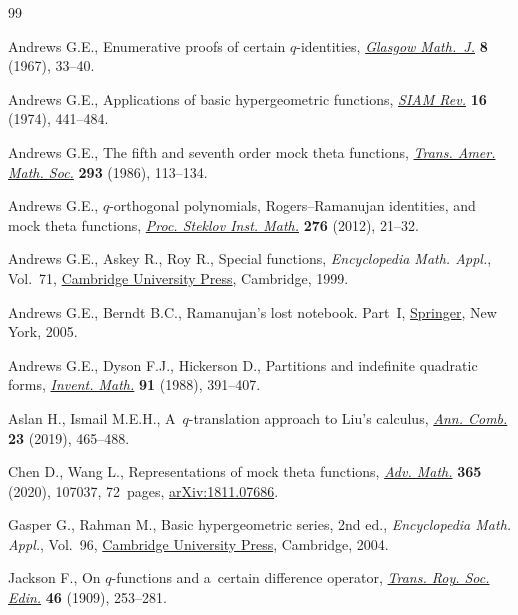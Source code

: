 \begin{thebibliography}{99}
\footnotesize\itemsep=0pt

Andrews G.E., Enumerative proofs of certain {$q$}-identities, \href{https://doi.org/10.1017/S0017089500000057}{\textit{Glasgow
 Math.~J.}} \textbf{8} (1967), 33--40.

Andrews G.E., Applications of basic hypergeometric functions, \href{https://doi.org/10.1137/1016081}{\textit{SIAM
 Rev.}} \textbf{16} (1974), 441--484.

Andrews G.E., The fifth and seventh order mock theta functions, \href{https://doi.org/10.2307/2000275}{\textit{Trans.
 Amer. Math. Soc.}} \textbf{293} (1986), 113--134.

Andrews G.E., {$q$}-orthogonal polynomials, {R}ogers--{R}amanujan identities,
 and mock theta functions, \href{https://doi.org/10.1134/S0081543812010038}{\textit{Proc. Steklov Inst. Math.}} \textbf{276}
 (2012), 21--32.

Andrews G.E., Askey R., Roy R., Special functions, \textit{Encyclopedia Math.
 Appl.}, Vol.~71, \href{https://doi.org/10.1017/CBO9781107325937}{Cambridge University Press}, Cambridge, 1999.

Andrews G.E., Berndt B.C., Ramanujan's lost notebook. {P}art~{I}, \href{https://doi.org/10.1007/0-387-28124-X}{Springer}, New
 York, 2005.

Andrews G.E., Dyson F.J., Hickerson D., Partitions and indefinite quadratic
 forms, \href{https://doi.org/10.1007/BF01388778}{\textit{Invent. Math.}} \textbf{91} (1988), 391--407.

Aslan H., Ismail M.E.H., A~{$q$}-translation approach to {L}iu's calculus,
 \href{https://doi.org/10.1007/s00026-019-00450-x}{\textit{Ann. Comb.}} \textbf{23} (2019), 465--488.

Chen D., Wang L., Representations of mock theta functions, \href{https://doi.org/10.1016/j.aim.2020.107037}{\textit{Adv. Math.}}
 \textbf{365} (2020), 107037, 72~pages, \href{https://arxiv.org/abs/1811.07686}{arXiv:1811.07686}.

Gasper G., Rahman M., Basic hypergeometric series, 2nd ed., \textit{Encyclopedia Math.
 Appl.}, Vol.~96, \href{https://doi.org/10.1017/CBO9780511526251}{Cambridge University Press}, Cambridge, 2004.

Jackson F., On $q$-functions and a~certain difference operator, \href{https://doi.org/10.1017/S0080456800002751}{\textit{Trans.
 Roy. Soc. Edin.}} \textbf{46} (1909), 253--281.


\end{thebibliography}
